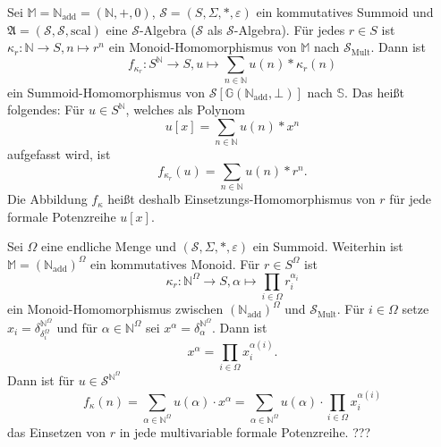 \documentclass{article}
\begin{document}
\newpage

\begin{example}
  Sei $\mathbb{M} = \mathbb{N}_\text{add} = (\mathbb{N}, +, 0)$,
  $\mathcal{S} = (S, \Sigma, \ast, \varepsilon)$ ein kommutatives Summoid
  und $\mathfrak{A} = (\mathcal{S}, \mathcal{S}, \text{scal})$
  eine $\mathcal{S}$-Algebra ($\mathcal{S}$ als $\mathcal{S}$-Algebra).
  Für jedes $r \in S$ ist $\kappa_r \colon \mathbb{N} \to S, n \mapsto r^n$
  ein Monoid-Homomorphismus von $\mathbb{M}$ nach $\mathcal{S}_\text{Mult}$.
  Dann ist 
  \begin{equation*}
    f_{\kappa_r} \colon S^\mathbb{N} \to S, u \mapsto \sum_{n \in \mathbb{N}}u(n) \ast \kappa_r(n)
  \end{equation*}
  ein Summoid-Homomorphismus von $\mathcal{S}[\mathbb{G}(\mathbb{N}_\text{add}, \bot)]$ nach $\mathbb{S}$.
  Das heißt folgendes: Für $u \in S^\mathbb{N}$, welches als Polynom
  \begin{equation*}
    u[x] = \sum_{n \in \mathbb{N}} u(n) \ast x^n
  \end{equation*}
  aufgefasst wird, ist
  \begin{equation*}
    f_{\kappa_r}(u) = \sum_{n \in \mathbb{N}} u(n) \ast r^n.
  \end{equation*}
  Die Abbildung $f_\kappa$ heißt deshalb Einsetzungs-Homomorphismus von $r$ für jede formale Potenzreihe $u[x]$.
\end{example}

\begin{example}
  Sei $\Omega$ eine endliche Menge
  und $(\mathcal{S}, \Sigma, \ast, \varepsilon)$ ein Summoid.
  Weiterhin ist $\mathbb{M} = (\mathbb{N}_\text{add})^\Omega$ ein kommutatives Monoid.
  Für $r \in S^\Omega$ ist 
  \begin{equation*}
    \kappa_r \colon \mathbb{N}^\Omega \to S, \alpha \mapsto \prod_{i \in \Omega}r_i^{\alpha_i}
  \end{equation*}
  ein Monoid-Homomorphismus zwischen $(\mathbb{N}_\text{add})^\Omega$ und $\mathcal{S}_\text{Mult}$.
  Für $i \in \Omega$ setze $x_i = \delta^{\mathbb{N}^\Omega}_{\delta^\Omega_i}$
  und für $\alpha \in \mathbb{N}^\Omega$ sei $x^\alpha = \delta^{\mathbb{N}^\Omega}_\alpha$.
  Dann ist
  \begin{equation*}
    x^\alpha = \prod_{i \in \Omega}x_i^{\alpha(i)}.
  \end{equation*}
  Dann ist für $u \in \mathcal{S}^{\mathbb{N}^\Omega}$
  \begin{equation*}
    f_\kappa(n) = \sum_{\alpha \in \mathbb{N}^\Omega}u(\alpha) \cdot x^\alpha = \sum_{\alpha \in \mathbb{N}^\Omega}u(\alpha)\cdot \prod_{i \in \Omega}x_i^{\alpha(i)}
  \end{equation*}
  das Einsetzen von $r$ in jede multivariable formale Potenzreihe.
  ???
\end{example}
\end{document}
